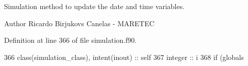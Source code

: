 Simulation method to update the date and time variables. 

\begin{DoxyAuthor}{Author}
Ricardo Birjukovs Canelas -\/ M\+A\+R\+E\+T\+EC 
\end{DoxyAuthor}


Definition at line 366 of file simulation.\+f90.


\begin{DoxyCode}
366     \textcolor{keywordtype}{class}(simulation\_class), \textcolor{keywordtype}{intent(inout)} :: self
367     \textcolor{keywordtype}{integer} :: i
368     \textcolor{keywordflow}{if} (globals%
\end{DoxyCode}
